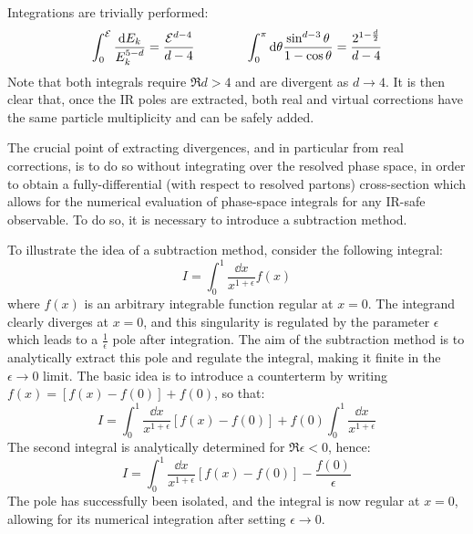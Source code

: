 Integrations are trivially performed:
\begin{equation*}
  \int_0^{\mathcal{E}} \frac{\mathrm{d} E_k}{E_k^{5 - d}} = \frac{\mathcal{E}^{d-4}}{d-4}
  \qquad \qquad
  \int_0^\pi \mathrm{d} \theta \frac{\sin^{d-3} \theta}{1 - \cos \theta} = \frac{2^{1 - \frac{d}{2}}}{d - 4}
\end{equation*}
Note that both integrals require $ \Re{d} > 4 $ and are divergent as $ d \rightarrow 4 $. It is then clear that, once the IR poles are extracted, both real and virtual corrections have the same particle multiplicity and can be safely added.

The crucial point of extracting divergences, and in particular from real corrections, is to do so without integrating over the resolved phase space, in order to obtain a fully-differential (with respect to resolved partons) cross-section which allows for the numerical evaluation of phase-space integrals for any IR-safe observable. To do so, it is necessary to introduce a subtraction method.

To illustrate the idea of a subtraction method, consider the following integral:
\begin{equation}
  I = \int_0^1 \frac{\dd x}{x^{1 + \epsilon}} f(x)
\end{equation}
where $ f(x) $ is an arbitrary integrable function regular at $ x = 0 $. The integrand clearly diverges at $ x = 0 $, and this singularity is regulated by the parameter $ \epsilon $ which leads to a $ \frac{1}{\epsilon} $ pole after integration. The aim of the subtraction method is to analytically extract this pole and regulate the integral, making it finite in the $ \epsilon \rightarrow 0 $ limit. The basic idea is to introduce a counterterm by writing $ f(x) = [f(x) - f(0)] + f(0) $, so that:
\begin{equation*}
  I = \int_0^1 \frac{\dd x}{x^{1 + \epsilon}} \left[ f(x) - f(0) \right] + f(0) \int_0^1 \frac{\dd x}{x^{1 + \epsilon}}
\end{equation*}
The second integral is analytically determined for $ \Re{\epsilon} < 0 $, hence:
\begin{equation}
  I = \int_0^1 \frac{\dd x}{x^{1 + \epsilon}} \left[ f(x) - f(0) \right] - \frac{f(0)}{\epsilon}
  \label{eq:reg-i}
\end{equation}
The pole has successfully been isolated, and the integral is now regular at $ x = 0 $, allowing for its numerical integration after setting $ \epsilon \rightarrow 0 $.

